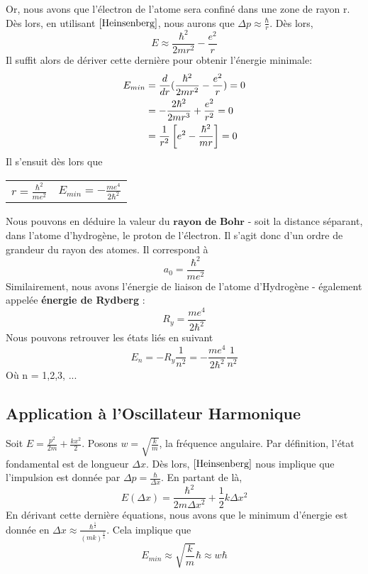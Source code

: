 \documentclass[../Notes de cours]{subfiles}
\begin{document}
Or, nous avons que l'électron de l'atome sera confiné dans une zone de rayon r. Dès lors, en utilisant $\ref{Heinsenberg}$, nous aurons que $\Delta p \approx \frac{\hbar}{r}$. Dès lors,
\begin{equation}
E \approx \frac{\hbar^2}{2mr^2} - \frac{e^2}{r}
\end{equation}
Il suffit alors de dériver cette dernière pour obtenir l'énergie minimale:
\begin{align*}
E_{min} &= \frac{d}{dr} (\frac{\hbar^2}{2mr^2} - \frac{e^2}{r}) = 0\\
&= - \frac{2 \hbar^2}{2mr^3} + \frac{e^2}{r^2} = 0\\
&= \frac{1}{r^2} \left[e^2 - \frac{\hbar^2}{mr} \right] = 0
\end{align*}
Il s'ensuit dès lors que 
\begin{center}
\begin{tabular}{c c}
$r = \frac{\hbar^2}{me^2}$ & $E_{min} = - \frac{me^4}{2 \hbar^2}$
\end{tabular}
\end{center}
Nous pouvons en déduire la valeur du $\textbf{rayon de Bohr}$ - soit la distance séparant, dans l'atome d'hydrogène, le proton de l'électron. Il s'agit donc d'un ordre de grandeur du rayon des atomes. Il correspond à 
\begin{equation}
\label{Rayon de Bohr}
a_0 = \frac{\hbar^2}{me^2}
\end{equation}
Similairement, nous avons l'énergie de liaison de l'atome d'Hydrogène - également appelée \textbf{énergie de Rydberg} :
\begin{equation}
R_y = \frac{me^4}{2 \hbar^2}
\end{equation}
Nous pouvons retrouver les états liés en suivant
\begin{equation}
\label{Etats liés}
E_n = - R_y \frac{1}{n^2} = - \frac{me^4}{2 \hbar^2} \frac{1}{n^2}
\end{equation}
Où n = 1,2,3, ...

\subsection{Application à l'Oscillateur Harmonique}
Soit $E = \frac{p^2}{2m} + \frac{kx^2}{2}$. Posons $w = \sqrt{\frac{k}{m}}$, la fréquence angulaire. Par définition, l'état fondamental est de longueur $\Delta x$. Dès lors, $\ref{Heinsenberg}$ nous implique que l'impulsion est donnée par $\Delta p = \frac{\hbar}{\Delta x}$. En partant de là,
\begin{equation}
E \left(\Delta x \right) = \frac{\hbar^2}{2m\Delta x^2} + \frac{1}{2} k \Delta x^2
\end{equation}
En dérivant cette dernière équations, nous avons que le minimum d'énergie est donnée en $\Delta x \approx \frac{\hbar^{\frac{1}{2}}}{\left(mk\right)^{\frac{1}{4}}}$. Cela implique que
\begin{equation}
\label{Energie OH}
E_{min} \approx \sqrt{\frac{k}{m}} \hbar \approx w \hbar
\end{equation}
\end{document}

